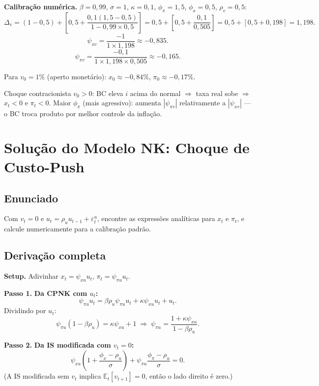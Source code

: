 \documentclass[12pt, a4paper]{article}
\newcommand{\E}{\mathbb{E}}
\begin{document}
\textbf{Calibração numérica.}
$\beta=0{,}99$, $\sigma=1$, $\kappa=0{,}1$, $\phi_\pi=1{,}5$, $\phi_x=0{,}5$, $\rho_v=0{,}5$:
\[
\Delta_v = (1-0{,}5) + \left[0{,}5 + \frac{0{,}1(1{,}5-0{,}5)}{1-0{,}99\times0{,}5}\right]
= 0{,}5 + \left[0{,}5 + \frac{0{,}1}{0{,}505}\right]
= 0{,}5 + [0{,}5 + 0{,}198] = 1{,}198.
\]
\[
\psi_{xv} = \frac{-1}{1\times 1{,}198} \approx -0{,}835.
\]
\[
\psi_{\pi v} = \frac{-0{,}1}{1\times 1{,}198\times 0{,}505} \approx -0{,}165.
\]

Para $v_0 = 1\%$ (aperto monetário): $x_0 \approx -0{,}84\%$, $\pi_0 \approx -0{,}17\%$.

\begin{provabox}[title={Interpretação da solução (Q9)}]
Choque contracionista $v_0 > 0$: BC eleva $i$ acima do normal $\Rightarrow$ taxa
real sobe $\Rightarrow$ $x_t < 0$ e $\pi_t < 0$. Maior $\phi_\pi$ (mais agressivo):
aumenta $|\psi_{\pi v}|$ relativamente a $|\psi_{xv}|$ --- o BC troca produto por
melhor controle da inflação.
\end{provabox}

\section{Solução do Modelo NK: Choque de Custo-Push}

\subsection*{Enunciado}
Com $v_t = 0$ e $u_t = \rho_u u_{t-1} + \varepsilon_t^u$, encontre as expressões
analíticas para $x_t$ e $\pi_t$, e calcule numericamente para a calibração padrão.

\subsection*{Derivação completa}

\textbf{Setup.} Adivinhar $x_t = \psi_{xu}u_t$, $\pi_t = \psi_{\pi u}u_t$.

\textbf{Passo 1.} \textbf{Da CPNK com $u_t$:}
\[
\psi_{\pi u}u_t = \beta\rho_u\psi_{\pi u}u_t + \kappa\psi_{xu}u_t + u_t.
\]
Dividindo por $u_t$:
\[
\psi_{\pi u}(1-\beta\rho_u) = \kappa\psi_{xu} + 1
\;\Rightarrow\;
\psi_{\pi u} = \frac{1+\kappa\psi_{xu}}{1-\beta\rho_u}. \tag{II}
\]

\textbf{Passo 2.} \textbf{Da IS modificada com $v_t=0$:}
\[
\psi_{xu}\!\left(1 + \frac{\phi_x-\rho_u}{\sigma}\right)
+ \psi_{\pi u}\!\frac{\phi_\pi-\rho_u}{\sigma} = 0.
\]
(A IS modificada sem $v_t$ implica $\E_t[v_{t+1}]=0$, então o lado direito é zero.)
\end{document}
